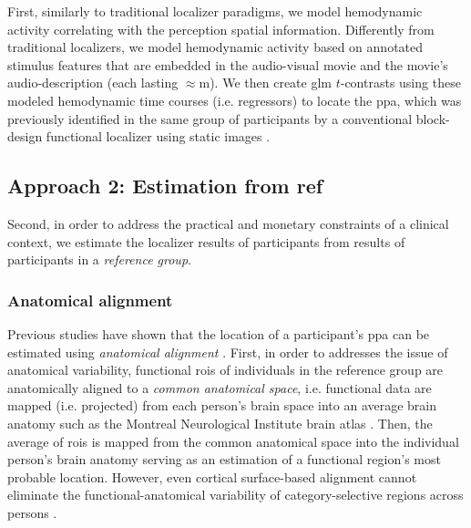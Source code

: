 First, similarly to traditional localizer paradigms, we model hemodynamic
activity correlating with the perception spatial information.
Differently from traditional localizers, we model hemodynamic activity based on
annotated stimulus features that are embedded in the audio-visual movie and the
movie's audio-description (each lasting $\approx$\unit[120]{m}).
We then create \ac{glm} $t$-contrasts using these modeled hemodynamic time
courses (i.e. regressors) to locate the \ac{ppa}, which was previously
identified in the same group of participants by a conventional block-design
functional localizer using static images \citep{sengupta2016extension}.


\subsection{Approach 2: Estimation from ref}




Second, in order to address the practical and monetary constraints of a clinical
context, we estimate the localizer results of participants from results of
participants in a \textit{reference group}.


\subsubsection{Anatomical alignment}
Previous studies have shown that the location of a participant's \ac{ppa} can be
estimated using \textit{anatomical alignment} \citep{frost2012measuring,
rosenke2021probabilistic, weiner2018defining, zhen2017quantifying}.
%
First, in order to addresses the issue of anatomical variability, functional
\acp{roi} of individuals in the reference group are anatomically aligned to a
\textit{common anatomical space}, i.e. functional data are mapped (i.e.
projected) from each person's brain space into an average brain anatomy such as
the Montreal Neurological Institute brain atlas
\citep[MNI152,][]{fonov2011unbiased}.
%
Then, the average of \acp{roi} is mapped from the common anatomical space into
the individual person's brain anatomy serving as an estimation of a functional
region's most probable location.
%
However, even cortical surface-based alignment \citep{fischl1999cortical,
yeo2009spherical} cannot eliminate the functional-anatomical variability of
category-selective regions across persons \citep{frost2012measuring,
weiner2018defining, weiner2014mid}.


